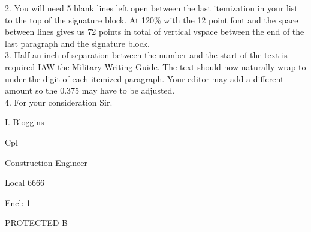 \documentclass[12pt]{amsart} %
\begin{document}
2. \hspace{0.375in}You will need 5 blank lines left open between the last itemization in your list to the top of the signature block. At 120\% with the 12 point font and the space between lines gives us 72 points in total of vertical vspace between the end of the last paragraph and the signature block. \\

3. \hspace{0.375in}Half an inch of separation between the number and the start of the text is required IAW the Military Writing Guide. The text should now naturally wrap to under the digit of each itemized paragraph. Your editor may add a different amount so the 0.375 may have to be adjusted.  \\

4. \hspace{0.375in}For your consideration Sir.


\vspace*{72pt} %



I. Bloggins

Cpl

Construction Engineer

Local 6666

\vspace{14pt}



Encl: 1 %








\vfill %

\nopagebreak \uline{PROTECTED B} 

\end{document}
